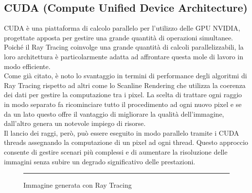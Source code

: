 \documentclass[main.tex]{subfiles}
\begin{document}
\subsection{CUDA (Compute Unified Device Architecture)}
\hspace*{0.25in}CUDA è una piattaforma di calcolo parallelo per l'utilizzo delle GPU NVIDIA, progettate apposta per gestire una grande quantità di operazioni simultanee. Poiché il Ray Tracing coinvolge una grande quantità di calcoli parallelizzabili, la loro architettura è particolarmente adatta ad affrontare questa mole di lavoro in modo efficiente. \\
Come già citato, è noto lo svantaggio in termini di performance degli algoritmi di Ray Tracing rispetto ad altri come lo Scanline Rendering \cite{ScanlineAlgo} che utilizza la coerenza dei dati per gestire la computazione tra i pixel. La scelta di trattare ogni raggio in modo separato fa ricominciare tutto il procedimento ad ogni nuovo pixel e se da un lato questo offre il vantaggio di migliorare la qualità dell'immagine, dall'altro genera un notevole impiego di risorse.\\ 
Il lancio dei raggi, però, può essere eseguito in modo parallelo tramite i CUDA threads assegnando la computazione di un pixel ad ogni thread. Questo approccio consente di gestire scenari più complessi e di aumentare la risoluzione delle immagini senza subire un degrado significativo delle prestazioni. \\

\begin{figure}[h]
    \centering
    \caption{Immagine generata con Ray Tracing}\vspace{-14pt}\rule{0.55\linewidth}{0.4pt}
\end{figure}
\end{document}
